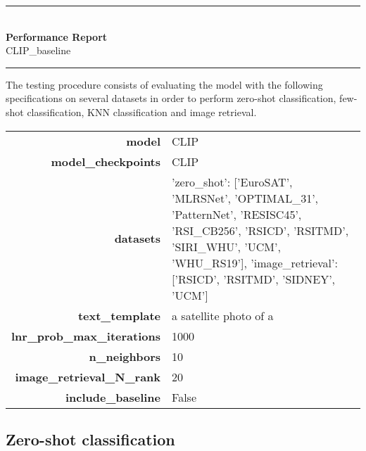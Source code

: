 \documentclass[11pt]{article}
\begin{document}
\thispagestyle{empty} 

\newcommand{\HRule}{\rule{\linewidth}{0.3mm}}
\begin{centering}
\HRule \\[0.5cm]
{\Huge \bfseries Performance Report}\\[0.3cm] 
{\Large CLIP\_baseline}\\[0.3cm] 
\HRule
\vspace{0.5cm}
\end{centering}

\noindent
The testing procedure consists of evaluating the model with the following specifications on several datasets in order to perform zero-shot classification, few-shot classification, KNN classification and image retrieval.

\begin{table}[H]
\centering
\begin{tabularx}{\columnwidth}{r|X}
\textbf{model} & CLIP \\
\textbf{model\_checkpoints} & CLIP \\
\textbf{datasets} & {'zero\_shot': ['EuroSAT', 'MLRSNet', 'OPTIMAL\_31', 'PatternNet', 'RESISC45', 'RSI\_CB256', 'RSICD', 'RSITMD', 'SIRI\_WHU', 'UCM', 'WHU\_RS19'], 'image\_retrieval': ['RSICD', 'RSITMD', 'SIDNEY', 'UCM']} \\
\textbf{text\_template} & a satellite photo of a  \\
\textbf{lnr\_prob\_max\_iterations} & 1000 \\
\textbf{n\_neighbors} & 10 \\
\textbf{image\_retrieval\_N\_rank} & 20 \\
\textbf{include\_baseline} & False \\
\end{tabularx}

\end{table}



\subsection*{Zero-shot classification}
\end{document}
